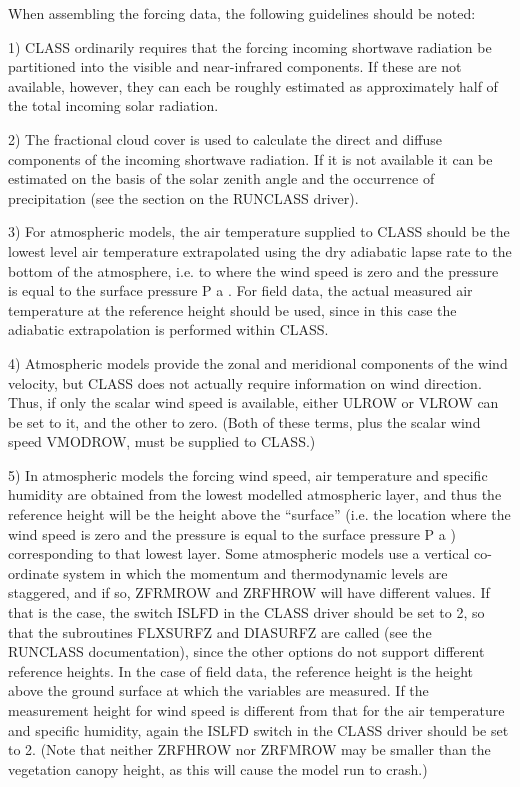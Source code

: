 When assembling the forcing data, the following guidelines should be noted\+:

1) C\+L\+A\+S\+S ordinarily requires that the forcing incoming shortwave radiation be partitioned into the visible and near-\/infrared components. If these are not available, however, they can each be roughly estimated as approximately half of the total incoming solar radiation.

2) The fractional cloud cover is used to calculate the direct and diffuse components of the incoming shortwave radiation. If it is not available it can be estimated on the basis of the solar zenith angle and the occurrence of precipitation (see the section on the R\+U\+N\+C\+L\+A\+S\+S driver).

3) For atmospheric models, the air temperature supplied to C\+L\+A\+S\+S should be the lowest level air temperature extrapolated using the dry adiabatic lapse rate to the bottom of the atmosphere, i.\+e. to where the wind speed is zero and the pressure is equal to the surface pressure P a . For field data, the actual measured air temperature at the reference height should be used, since in this case the adiabatic extrapolation is performed within C\+L\+A\+S\+S.

4) Atmospheric models provide the zonal and meridional components of the wind velocity, but C\+L\+A\+S\+S does not actually require information on wind direction. Thus, if only the scalar wind speed is available, either U\+L\+R\+O\+W or V\+L\+R\+O\+W can be set to it, and the other to zero. (Both of these terms, plus the scalar wind speed V\+M\+O\+D\+R\+O\+W, must be supplied to C\+L\+A\+S\+S.)

5) In atmospheric models the forcing wind speed, air temperature and specific humidity are obtained from the lowest modelled atmospheric layer, and thus the reference height will be the height above the “surface” (i.\+e. the location where the wind speed is zero and the pressure is equal to the surface pressure P a ) corresponding to that lowest layer. Some atmospheric models use a vertical co-\/ordinate system in which the momentum and thermodynamic levels are staggered, and if so, Z\+F\+R\+M\+R\+O\+W and Z\+R\+F\+H\+R\+O\+W will have different values. If that is the case, the switch I\+S\+L\+F\+D in the C\+L\+A\+S\+S driver should be set to 2, so that the subroutines F\+L\+X\+S\+U\+R\+F\+Z and D\+I\+A\+S\+U\+R\+F\+Z are called (see the R\+U\+N\+C\+L\+A\+S\+S documentation), since the other options do not support different reference heights. In the case of field data, the reference height is the height above the ground surface at which the variables are measured. If the measurement height for wind speed is different from that for the air temperature and specific humidity, again the I\+S\+L\+F\+D switch in the C\+L\+A\+S\+S driver should be set to 2. (Note that neither Z\+R\+F\+H\+R\+O\+W nor Z\+R\+F\+M\+R\+O\+W may be smaller than the vegetation canopy height, as this will cause the model run to crash.)

